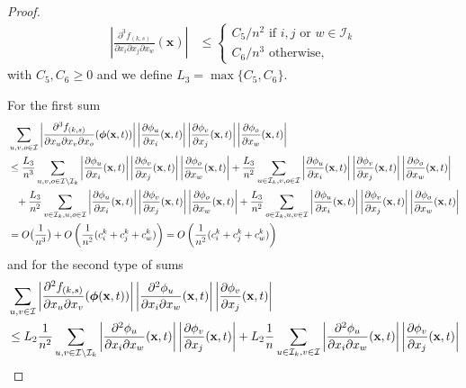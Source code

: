 \documentclass[acmsmall]{acmart}
\newcommand\bx{\mathbf{x}}
\newcommand\bphi{\text{\boldmath$\phi$}}
\newcommand\calI{\mathcal{I}}
\newcommand\abs[1]{\left|#1\right|}         %
\newcommand{\ddd}[4]{ \frac{\partial^3 #1 }{ \partial x_{#2} \partial x_{#3} \partial x_{#4} }}
\newcommand{\dd}[3]{ \frac{\partial^2 #1 }{ \partial x_{#2} \partial x_{#3}}}
\begin{document}
\begin{proof}
\color{myorange}
\begin{align*}
\abs{\ddd{f_{(k,s)}}{i}{j}{w}(\bx)} & \leq 
\begin{cases}
C_5/n^2 \text{ if } i,j \text{ or } w \in \calI_k \\
C_6/n^3 \text{ otherwise,} 
\end{cases} 
\end{align*}
 with $C_5,C_6 \geq 0$ and we define $L_3 = \max\{C_5,C_6 \}$.

For the first sum
\begin{align*}
& \sum_{u,v,o\in \calI} \abs{\ddd{f_{(k,s)}}{u}{v}{o}(\bphi (\bx,t))} \abs{\frac{\partial \phi_{u}}{\partial x_i}(\bx,t)} \abs{\frac{\partial \phi_{v}}{\partial x_j}(\bx,t)} \abs{\frac{\partial \phi_{o}}{\partial x_w}(\bx,t)} \\
& \leq \frac{L_3}{n^3} \sum_{u,v,o \in \calI \setminus \calI_k} \abs{\frac{\partial \phi_{u}}{\partial x_i}(\bx,t)} \abs{\frac{\partial \phi_{v}}{\partial x_j}(\bx,t)} \abs{\frac{\partial \phi_{o}}{\partial x_w}(\bx,t)}
+ \frac{L_3}{n^2} \sum_{u \in \calI_k, v,o \in \calI} \abs{\frac{\partial \phi_{u}}{\partial x_i}(\bx,t)} \abs{\frac{\partial \phi_{v}}{\partial x_j}(\bx,t)} \abs{\frac{\partial \phi_{o}}{\partial x_w}(\bx,t)} \\
& \phantom{\leq} + \frac{L_3}{n^2} \sum_{v \in \calI_k, u,o \in \calI} \abs{\frac{\partial \phi_{u}}{\partial x_i}(\bx,t)}  \abs{\frac{\partial \phi_{v}}{\partial x_j}(\bx,t)} \abs{\frac{\partial \phi_{o}}{\partial x_w}(\bx,t)} + \frac{L_3}{n^2} \sum_{o \in \calI_k, u,v \in \calI} \abs{\frac{\partial \phi_{u}}{\partial x_i}(\bx,t)} \abs{\frac{\partial \phi_{v}}{\partial x_j}(\bx,t)} \abs{\frac{\partial \phi_{o}}{\partial x_w}(\bx,t)} \\
& = O\bigl(\frac{1}{n^3}\bigr) + O\left(\frac{1}{n^2}(c^k_i + c^k_j + c^k_w)\right) = O\left(\frac{1}{n^2}(c^k_i + c^k_j + c^k_w)\right)
\end{align*}
\color{black}
and for the second type of sums 
\begin{align*}
& \sum_{u,v \in \calI} \abs{\dd{f_{(k,s)}}{u}{v}(\bphi (\bx,t))} \abs{\dd{\phi_{u}}{i}{w}(\bx,t)} \abs{\frac{\partial \phi_{v}}{\partial x_j}(\bx,t)} \\
& \leq L_{2}\frac{1}{n^2} \sum_{u,v \in \calI \setminus \calI_k} \abs{\dd{\phi_{u}}{i}{w}(\bx,t)} \abs{\frac{\partial \phi_{v}}{\partial x_j}(\bx,t)}
 + L_{2}\frac{1}{n} \sum_{u\in \calI_k ,v \in \calI} \abs{\dd{\phi_{u}}{i}{w}(\bx,t)} \abs{\frac{\partial \phi_{v}}{\partial x_j}(\bx,t)} \\

\end{align*}
\end{proof}
\end{document}
